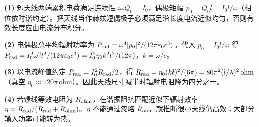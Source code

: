 \par\noindent\textbf{(1)} 短天线两端累积电荷满足连续性 \(i\omega Q_0=I_0\)，偶极矩幅 \(p_0=Q_0l=I_0l/\omega\)（相位依时谐约定）。把天线当作赫兹短偶极子必须满足沿长度电流近似均匀，否则有效长度应由电流分布积分。
\par\noindent\textbf{(2)} 电偶极总平均辐射功率为 \(P_{\rm rad}=\omega^4|p_0|^2/(12\pi\varepsilon_0c^3)\)。代入 \(p_0=I_0l/\omega\) 得 \(P_{\rm rad}=I_0^2\omega^2l^2/(12\pi\varepsilon_0c^3)=I_0^2\eta_0k^2l^2/(12\pi)\)，\(k=\omega/c\)。
\par\noindent\textbf{(3)} 以电流峰值约定 \(P_{\rm rad}=I_0^2R_{\rm rad}/2\)，得 \(R_{\rm rad}=\eta_0(k l)^2/(6\pi)=80\pi^2(l/\lambda)^2\,\mathrm{ohm}\)（真空 \(\eta_0\approx120\pi\,\mathrm{ohm}\)）。因此天线尺寸减半时辐射电阻降为四分之一。
\par\noindent\textbf{(4)} 若馈线等效电阻为 \(R_{\rm ohm}\)，在谐振阻抗匹配近似下辐射效率 \(\eta=R_{\rm rad}/(R_{\rm rad}+R_{\rm ohm})\)。\(\eta\) 不能通过忽略 \(R_{\rm ohm}\) 就推断很小天线仍高效；大部分输入功率可能转为热。
